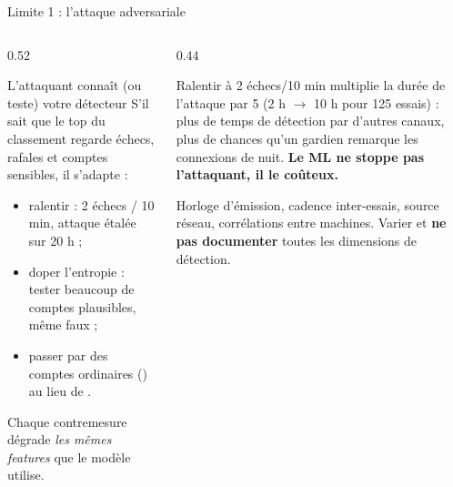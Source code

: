 \begin{frame}{Limite 1 : l'attaque adversariale}
\begin{columns}[t]
\begin{column}{0.52\textwidth}
\begin{block}{L'attaquant connaît (ou teste) votre détecteur}
S'il sait que le top du classement regarde échecs, rafales et comptes
sensibles, il s'adapte :
\begin{itemize}
\item ralentir : 2 échecs / 10 min, attaque étalée sur 20 h ;
\item doper l'entropie : tester beaucoup de comptes plausibles, même faux ;
\item passer par des comptes ordinaires () au lieu de .
\end{itemize}
Chaque contremesure dégrade \emph{les mêmes features} que le modèle utilise.
\end{block}
\end{column}
\begin{column}{0.44\textwidth}
\begin{ebox}
Ralentir à 2 échecs/10 min multiplie la durée de l'attaque par 5
(2 h $\rightarrow$ 10 h pour 125 essais) : plus de temps de détection
par d'autres canaux, plus de chances qu'un gardien remarque les connexions
de nuit. \textbf{Le ML ne stoppe pas l'attaquant, il le coûteux.}
\end{ebox}
\begin{kbox}[La parade]
Horloge d'émission, cadence inter-essais, source réseau, corrélations entre
machines. Varier et \textbf{ne pas documenter} toutes les dimensions de détection.
\end{kbox}
\end{column}
\end{columns}
\end{frame}

